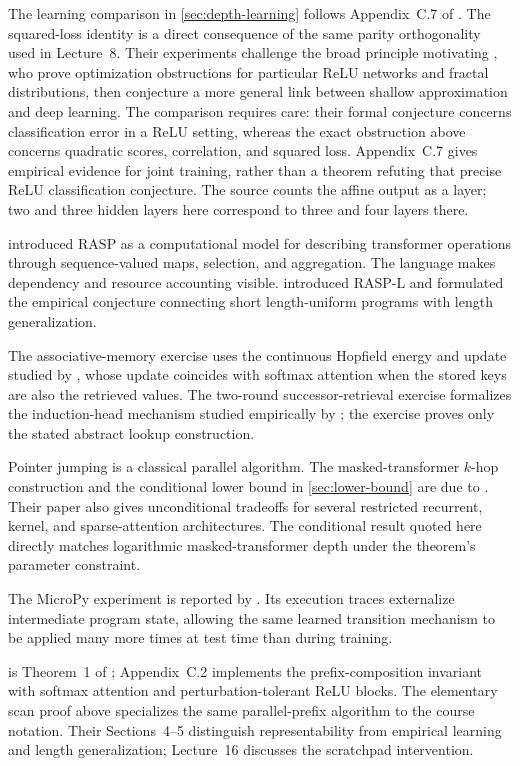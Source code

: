 \documentclass[11pt,twoside]{article}
\theoremstyle{definition}
\theoremstyle{remark}
\begin{document}
The learning comparison in \cref{sec:depth-learning} follows Appendix~C.7
of \citet{barak2022}. The squared-loss identity is a direct consequence of
the same parity orthogonality used in Lecture~8. Their experiments challenge
the broad principle motivating \citet{malach2019}, who prove optimization
obstructions for particular ReLU networks and fractal distributions, then
conjecture a more general link between shallow approximation and deep
learning. The comparison requires care: their formal conjecture concerns
classification error in a ReLU setting, whereas the exact obstruction above
concerns quadratic scores, correlation, and squared loss. Appendix~C.7 gives
empirical evidence for joint training, rather than a theorem refuting that
precise ReLU classification conjecture. The source counts the affine output
as a layer; two and three hidden layers here correspond to three and four
layers there.

\citet{weiss2021} introduced RASP as a computational model for describing
transformer operations through sequence-valued maps, selection, and
aggregation. The language makes dependency and resource accounting visible.
\citet{zhou2024} introduced RASP-L and formulated the empirical conjecture
connecting short length-uniform programs with length generalization.

The associative-memory exercise uses the continuous Hopfield energy and
update studied by \citet{ramsauer2021}, whose update coincides with softmax
attention when the stored keys are also the retrieved values. The two-round
successor-retrieval exercise formalizes the induction-head mechanism studied
empirically by \citet{olsson2022}; the exercise proves only the stated abstract
lookup construction.

Pointer jumping is a classical parallel algorithm. The masked-transformer
$k$-hop construction and the conditional lower bound in
\cref{sec:lower-bound} are due to \citet{sanford2024}. Their paper also gives
unconditional tradeoffs for several restricted recurrent, kernel, and
sparse-attention architectures. The conditional result quoted here directly
matches logarithmic masked-transformer depth under the theorem's parameter
constraint.

The MicroPy experiment is reported by \citet{xu2026}. Its execution traces
externalize intermediate program state, allowing the same learned transition
mechanism to be applied many more times at test time than during training.

 is Theorem~1 of
\citet{liu2023automata}; Appendix~C.2 implements the prefix-composition
invariant with softmax attention and perturbation-tolerant ReLU blocks.
The elementary scan proof above specializes the same parallel-prefix
algorithm to the course notation. Their Sections~4--5 distinguish
representability from empirical learning and length generalization;
Lecture~16 discusses the scratchpad intervention.
\end{document}
